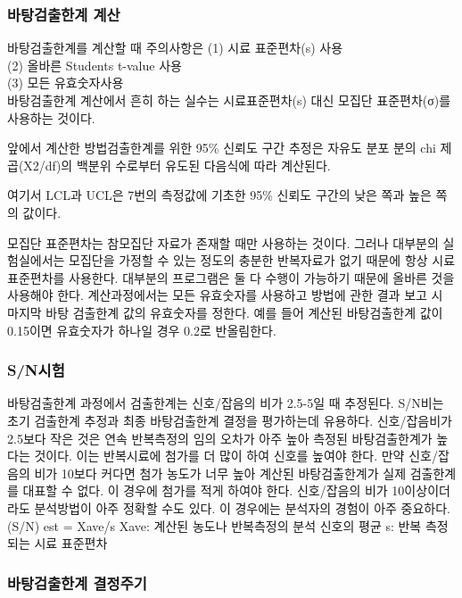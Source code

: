 \documentclass[
]{book}
\begin{document}
\hypertarget{uxbc14uxd0d5uxac80uxcd9cuxd55cuxacc4-uxacc4uxc0b0}{%
\subsubsection{바탕검출한계 계산}\label{uxbc14uxd0d5uxac80uxcd9cuxd55cuxacc4-uxacc4uxc0b0}}

바탕검출한계를 계산할 때 주의사항은
(1) 시료 표준편차(s) 사용\\
(2) 올바른 Students t-value 사용\\
(3) 모든 유효숫자사용\\
바탕검출한계 계산에서 흔히 하는 실수는 시료표준편차(s) 대신 모집단 표준편차(σ)를 사용하는 것이다.

앞에서 계산한 방법검출한계를 위한 95\% 신뢰도 구간 추정은 자유도 분포 분의 chi 제곱(X2/df)의 백분위 수로부터 유도된 다음식에 따라 계산된다.

여기서 LCL과 UCL은 7번의 측정값에 기초한 95\% 신뢰도 구간의 낮은 쪽과 높은 쪽의 값이다.

모집단 표준편차는 참모집단 자료가 존재할 때만 사용하는 것이다. 그러나 대부분의 실험실에서는 모집단을 가정할 수 있는 정도의 충분한 반복자료가 없기 때문에 항상 시료 표준편차를 사용한다. 대부분의 프로그램은 둘 다 수행이 가능하기 때문에 올바른 것을 사용해야 한다. 계산과정에서는 모든 유효숫자를 사용하고 방법에 관한 결과 보고 시 마지막 바탕 검출한계 값의 유효숫자를 정한다. 예를 들어 계산된 바탕검출한계 값이 0.15이면 유효숫자가 하나일 경우 0.2로 반올림한다.

\hypertarget{snuxc2dcuxd5d8}{%
\subsubsection{S/N시험}\label{snuxc2dcuxd5d8}}

바탕검출한계 과정에서 검출한계는 신호/잡음의 비가 2.5-5일 때 추정된다. S/N비는 초기 검출한계 추정과 최종 바탕검출한계 결정을 평가하는데 유용하다. 신호/잡음비가 2.5보다 작은 것은 연속 반복측정의 임의 오차가 아주 높아 측정된 바탕검출한계가 높다는 것이다. 이는 반복시료에 첨가를 더 많이 하여 신호를 높여야 한다. 만약 신호/잡음의 비가 10보다 커다면 첨가 농도가 너무 높아 계산된 바탕검출한계가 실제 검출한계를 대표할 수 없다. 이 경우에 첨가를 적게 하여야 한다. 신호/잡음의 비가 10이상이더라도 분석방법이 아주 정확할 수도 있다. 이 경우에는 분석자의 경험이 아주 중요하다.
(S/N) est = Xave/s
Xave: 계산된 농도나 반복측정의 분석 신호의 평균
s: 반복 측정되는 시료 표준편차

\hypertarget{uxbc14uxd0d5uxac80uxcd9cuxd55cuxacc4-uxacb0uxc815uxc8fcuxae30}{%
\subsubsection{바탕검출한계 결정주기}\label{uxbc14uxd0d5uxac80uxcd9cuxd55cuxacc4-uxacb0uxc815uxc8fcuxae30}}
\end{document}

